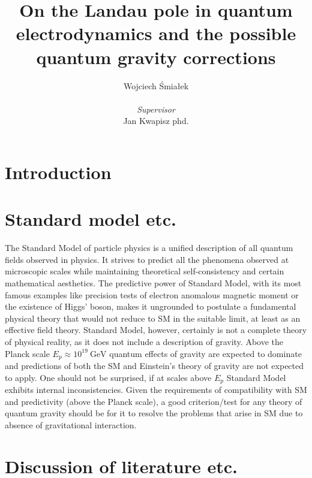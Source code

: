 \documentclass[11pt, a4paper]{article}
\title{\vspace{-2cm}On the Landau pole in quantum electrodynamics and the possible quantum gravity corrections}
\author{{Wojciech Śmiałek}\\
\\
{\textit{Supervisor}} \\
{Jan Kwapisz phd.}}
\date{}
\begin{document}
\maketitle

\section*{Introduction}

\section{Standard model etc.}
The Standard Model of particle physics is a unified description of all quantum fields observed in physics. 
It strives to predict all the phenomena observed at microscopic scales while maintaining theoretical
self-consistency and certain mathematical aesthetics. The predictive power of Standard Model, with its most
famous examples like precision tests of electron anomalous magnetic moment or the existence of Higgs' boson,
makes it ungrounded to postulate a fundamental physical theory that would not reduce to SM in the suitable limit, at least
as an effective field theory.
Standard Model, however, certainly is not a complete theory of physical reality, as it does not include a description
of gravity. Above the Planck scale $E_p \approx 10^{19} \ \text{GeV}$ quantum effects of gravity are expected to dominate
and predictions of both the SM and Einstein's theory of gravity are not expected to apply.
One should not be surprised, if at scales above $E_p$ Standard Model exhibits internal inconsistencies.
Given the requirements of compatibility with SM and predictivity (above the Planck scale), a good criterion/test
for any theory of quantum gravity should be for it to resolve the problems that arise in SM due to absence of
gravitational interaction. 


\section{Discussion of literature etc.}

\end{document}
